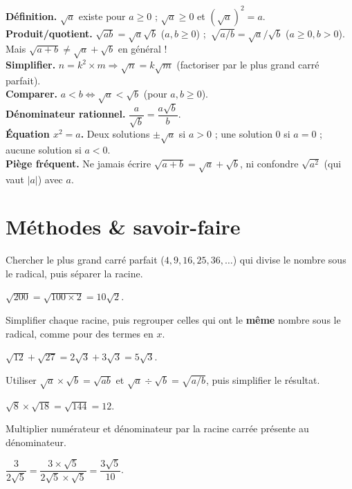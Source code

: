 \begin{synthese}
\textbf{Définition.} $\sqrt a$ existe pour $a\ge0$ ; $\sqrt a\ge0$ et $(\sqrt a)^{2}=a$.\\[4pt]
\textbf{Produit/quotient.} $\sqrt{ab}=\sqrt a\sqrt b$ ($a,b\ge0$) ;\
$\sqrt{a/b}=\sqrt a/\sqrt b$ ($a\ge0,b>0$). Mais $\sqrt{a+b}\ne\sqrt a+\sqrt b$ en
général !\\[4pt]
\textbf{Simplifier.} $n=k^{2}\times m\Rightarrow\sqrt n=k\sqrt m$ (factoriser par le plus
grand carré parfait).\\[4pt]
\textbf{Comparer.} $a<b\iff\sqrt a<\sqrt b$ (pour $a,b\ge0$).\\[4pt]
\textbf{Dénominateur rationnel.} $\dfrac a{\sqrt b}=\dfrac{a\sqrt b}b$.\\[4pt]
\textbf{Équation $x^{2}=a$.} Deux solutions $\pm\sqrt a$ si $a>0$ ; une solution $0$ si
$a=0$ ; aucune solution si $a<0$.\\[4pt]
\textbf{Piège fréquent.} Ne jamais écrire $\sqrt{a+b}=\sqrt a+\sqrt b$, ni confondre
$\sqrt{a^{2}}$ (qui vaut $|a|$) avec $a$.
\end{synthese}

\section{Méthodes \& savoir-faire}

Chercher le plus grand carré parfait ($4,9,16,25,36,\ldots$) qui divise le nombre sous le
radical, puis séparer la racine.
\begin{exemple}
$\sqrt{200}=\sqrt{100\times2}=10\sqrt2$.
\end{exemple}

Simplifier chaque racine, puis regrouper celles qui ont le \textbf{même} nombre sous le
radical, comme pour des termes en $x$.
\begin{exemple}
$\sqrt{12}+\sqrt{27}=2\sqrt3+3\sqrt3=5\sqrt3$.
\end{exemple}

Utiliser $\sqrt a\times\sqrt b=\sqrt{ab}$ et $\sqrt a\div\sqrt b=\sqrt{a/b}$, puis simplifier
le résultat.
\begin{exemple}
$\sqrt8\times\sqrt{18}=\sqrt{144}=12$.
\end{exemple}

Multiplier numérateur et dénominateur par la racine carrée présente au dénominateur.
\begin{exemple}
$\dfrac3{2\sqrt5}=\dfrac{3\times\sqrt5}{2\sqrt5\times\sqrt5}=\dfrac{3\sqrt5}{10}$.
\end{exemple}

